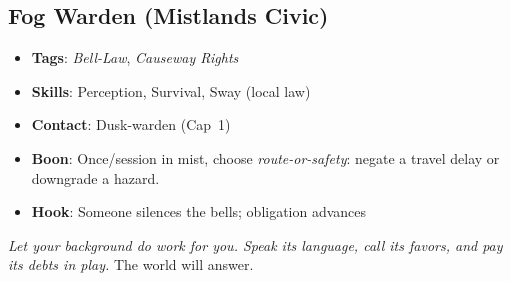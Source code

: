 \begin{multicols}{2}
\subsection*{Fog Warden (Mistlands Civic) }
\begin{itemize}
\item \textbf{Tags}: \textit{Bell-Law}, \textit{Causeway Rights}
\item \textbf{Skills}: Perception, Survival, Sway (local law)
\item \textbf{Contact}: Dusk-warden (Cap~1)
\item \textbf{Boon}: Once/session in mist, choose \emph{route-or-safety}: negate a travel delay or downgrade a hazard.
\item \textbf{Hook}: Someone silences the bells; obligation advances
\end{itemize}

\bigskip
\noindent\emph{Let your background do work for you. Speak its language, call its favors, and pay its debts in play.} The world will answer.

\end{multicols}


